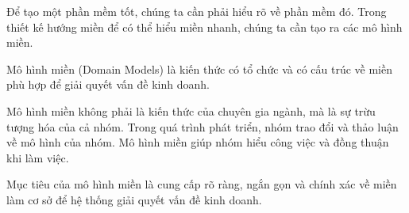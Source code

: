 Để tạo một phần mềm tốt, chúng ta cần phải hiểu rõ về phần mềm đó. Trong thiết kế hướng miền để có thể hiểu miền nhanh, chúng ta cần tạo ra các mô hình miền.

Mô hình miền  (Domain Models)  là kiến thức có tổ chức và có cấu trúc về miền phù hợp để giải quyết vấn đề kinh doanh.

Mô hình miền không phải là kiến thức của chuyên gia ngành, mà là sự trừu tượng hóa của cả nhóm.
Trong quá trình phát triển, nhóm trao đổi và thảo luận về mô hình của nhóm.
Mô hình miền giúp nhóm hiểu công việc và đồng thuận khi làm việc.



Mục tiêu     của mô hình miền là cung cấp   rõ ràng, ngắn gọn và chính xác về miền   làm cơ sở để     hệ thống     giải quyết   vấn đề kinh doanh.

 
 

 